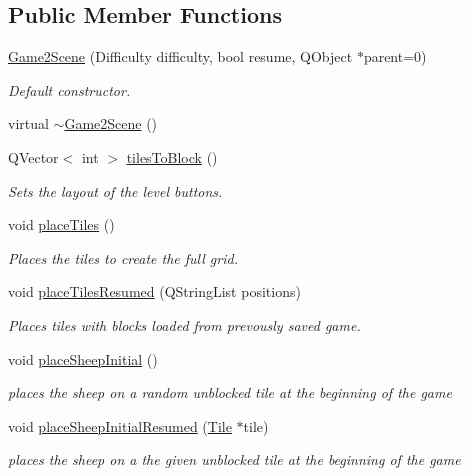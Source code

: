 \subsection*{\-Public \-Member \-Functions}
\begin{DoxyCompactItemize}
\item 
\hyperlink{classGame2Scene_aa12457bef5fc7d6b9794460cd5278d61}{\-Game2\-Scene} (\-Difficulty difficulty, bool resume, \-Q\-Object $\ast$parent=0)
\begin{DoxyCompactList}\small\item\em \-Default constructor. \end{DoxyCompactList}\item 
virtual \hyperlink{classGame2Scene_afb89d017cdab6ebf2c7224803fb88d2b}{$\sim$\-Game2\-Scene} ()
\item 
\-Q\-Vector$<$ int $>$ \hyperlink{classGame2Scene_a9b9cb03a70be505cdddbf41f4ca756b3}{tiles\-To\-Block} ()
\begin{DoxyCompactList}\small\item\em \-Sets the layout of the level buttons. \end{DoxyCompactList}\item 
void \hyperlink{classGame2Scene_a0d6f721674317295a05aa8754d0bd5ea}{place\-Tiles} ()
\begin{DoxyCompactList}\small\item\em \-Places the tiles to create the full grid. \end{DoxyCompactList}\item 
void \hyperlink{classGame2Scene_aa5da08510767483aefe5339411a41845}{place\-Tiles\-Resumed} (\-Q\-String\-List positions)
\begin{DoxyCompactList}\small\item\em \-Places tiles with blocks loaded from prevously saved game. \end{DoxyCompactList}\item 
void \hyperlink{classGame2Scene_a562bffb8b3f851df83bafd4aa006db5e}{place\-Sheep\-Initial} ()
\begin{DoxyCompactList}\small\item\em places the sheep on a random unblocked tile at the beginning of the game \end{DoxyCompactList}\item 
void \hyperlink{classGame2Scene_a24fc1f77c33e5c8aab234285fc2eb4d4}{place\-Sheep\-Initial\-Resumed} (\hyperlink{classTile}{\-Tile} $\ast$tile)
\begin{DoxyCompactList}\small\item\em places the sheep on a the given unblocked tile at the beginning of the game \end{DoxyCompactList}\item 

\end{DoxyCompactItemize}
